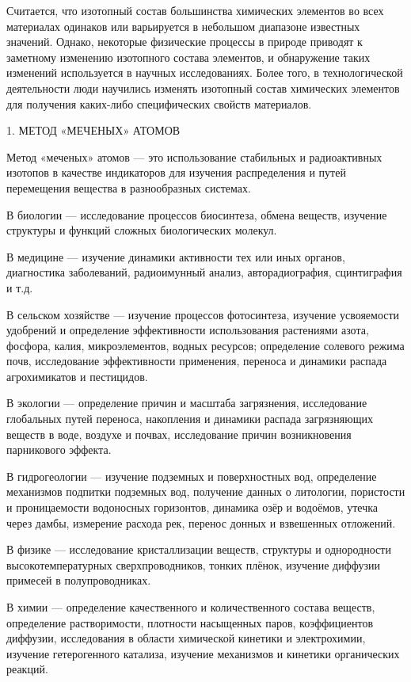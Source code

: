 \documentclass[a5paper,openany]{book}
\begin{document}
Считается, что изотопный состав большинства химических элементов во всех материалах одинаков или варьируется в небольшом диапазоне известных значений. Однако, некоторые физические процессы в природе приводят к заметному изменению изотопного состава элементов, и обнаружение таких изменений используется в научных исследованиях. Более того, в технологической деятельности люди научились изменять изотопный состав химических элементов для получения каких-либо специфических свойств материалов. 

1. МЕТОД «МЕЧЕНЫХ» АТОМОВ

Метод «меченых» атомов — это использование стабильных и радиоактивных изотопов в качестве индикаторов для изучения распределения и путей перемещения вещества в разнообразных системах.

В биологии — исследование процессов биосинтеза, обмена веществ, изучение структуры и функций сложных биологических молекул.

В медицине — изучение динамики активности тех или иных органов, диагностика заболеваний, радиоимунный анализ, авторадиография, сцинтиграфия и т.д.

В сельском хозяйстве — изучение процессов фотосинтеза, изучение усвояемости удобрений и определение эффективности использования растениями азота, фосфора, калия, микроэлементов, водных ресурсов; определение солевого режима почв, исследование эффективности применения, переноса и динамики распада агрохимикатов и пестицидов.

В экологии — определение причин и масштаба загрязнения, исследование глобальных путей переноса, накопления и динамики распада загрязняющих веществ в воде, воздухе и почвах, исследование причин возникновения парникового эффекта.

В гидрогеологии — изучение подземных и поверхностных вод, определение механизмов подпитки подземных вод, получение данных о литологии, пористости и проницаемости водоносных горизонтов, динамика озёр и водоёмов, утечка через дамбы, измерение расхода рек, перенос донных и взвешенных отложений.

В физике — исследование кристаллизации веществ, структуры и однородности высокотемпературных сверхпроводников, тонких плёнок, изучение диффузии примесей в полупроводниках.

В химии — определение качественного и количественного состава веществ, определение растворимости, плотности насыщенных паров, коэффициентов диффузии, исследования в области химической кинетики и электрохимии, изучение гетерогенного катализа, изучение механизмов и кинетики органических реакций.
\end{document}
